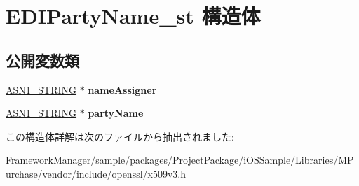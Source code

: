 \hypertarget{struct_e_d_i_party_name__st}{}\section{E\+D\+I\+Party\+Name\+\_\+st 構造体}
\label{struct_e_d_i_party_name__st}
\subsection*{公開変数類}
\begin{DoxyCompactItemize}
\item 
\hypertarget{struct_e_d_i_party_name__st_a433a2feeea84e1856f17d0aaba7479fa}{}\hyperlink{structasn1__string__st}{A\+S\+N1\+\_\+\+S\+T\+R\+I\+N\+G} $\ast$ {\bfseries name\+Assigner}\label{struct_e_d_i_party_name__st_a433a2feeea84e1856f17d0aaba7479fa}

\item 
\hypertarget{struct_e_d_i_party_name__st_ae0f4115f0794169a894b8a6e01539e50}{}\hyperlink{structasn1__string__st}{A\+S\+N1\+\_\+\+S\+T\+R\+I\+N\+G} $\ast$ {\bfseries party\+Name}\label{struct_e_d_i_party_name__st_ae0f4115f0794169a894b8a6e01539e50}

\end{DoxyCompactItemize}


この構造体詳解は次のファイルから抽出されました\+:\begin{DoxyCompactItemize}
\item 
Framework\+Manager/sample/packages/\+Project\+Package/i\+O\+S\+Sample/\+Libraries/\+M\+Purchase/vendor/include/openssl/x509v3.\+h\end{DoxyCompactItemize}
